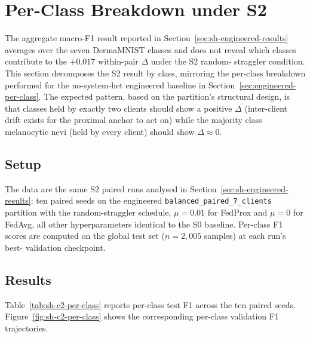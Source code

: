 \documentclass[11pt,a4paper]{report}
\begin{document}
\section{Per-Class Breakdown under S2}
\label{sec:sh-c2-per-class}

The aggregate macro-F1 result reported in
Section~\ref{sec:sh-engineered-results} averages over the seven
DermaMNIST classes and does not reveal which classes contribute
to the $+0.017$ within-pair $\Delta$ under the S2 random-
straggler condition. This section decomposes the S2 result by
class, mirroring the per-class breakdown performed for the
no-system-het engineered baseline in
Section~\ref{sec:engineered-per-class}. The expected pattern,
based on the partition's structural design, is that classes
held by exactly two clients should show a positive $\Delta$
(inter-client drift exists for the proximal anchor to act on)
while the majority class melanocytic nevi (held by every
client) should show $\Delta \approx 0$.

\subsection{Setup}
\label{sec:sh-c2-per-class-setup}

The data are the same S2 paired runs analysed in
Section~\ref{sec:sh-engineered-results}: ten paired seeds on
the engineered \texttt{balanced\_paired\_7\_clients} partition
with the random-straggler schedule, $\mu = 0.01$ for FedProx
and $\mu = 0$ for FedAvg, all other hyperparameters identical
to the S0 baseline. Per-class F1 scores are computed on the
global test set ($n = 2{,}005$ samples) at each run's best-
validation checkpoint.

\subsection{Results}
\label{sec:sh-c2-per-class-results}

Table~\ref{tab:sh-c2-per-class} reports per-class test F1
across the ten paired seeds. Figure~\ref{fig:sh-c2-per-class}
shows the corresponding per-class validation F1 trajectories.
\end{document}
